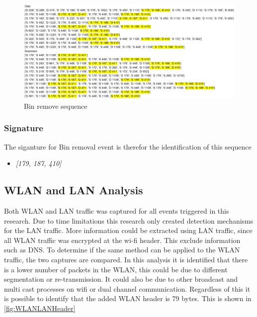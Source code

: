 \begin{figure}[H]
    \centering
    \includegraphics[width=\textwidth]{figures/Sequence_BR.png}
    \caption{Bin remove sequence}
    \label{fig:BRseq}
\end{figure}

\subsubsection{Signature}
The siganture for Bin removal event is therefor the identification of this sequence
\begin{itemize}
    \item \textit{[179, 187, 410]}
\end{itemize}


\subsection{WLAN and LAN Analysis}
Both WLAN and LAN traffic was captured for all events triggered in this research. Due to time limitations this research only created detection mechanisms for the LAN traffic. More information could be extracted using LAN traffic, since all WLAN traffic was encrypted at the wi-fi header. This exclude information such as DNS. 
To determine if the same method can be applied to the WLAN traffic, the two captures are compared. In this analysis it is identified that there is a lower number of packets in the WLAN, this could be due to different segmentation or re-transmission. It could also be due to other broadcast and multi cast processes on wifi or dual channel communication.   Regardless of this it is possible to identify that the added WLAN header is 79 bytes. This is shown in \ref{fig:WLANLANHeader}

